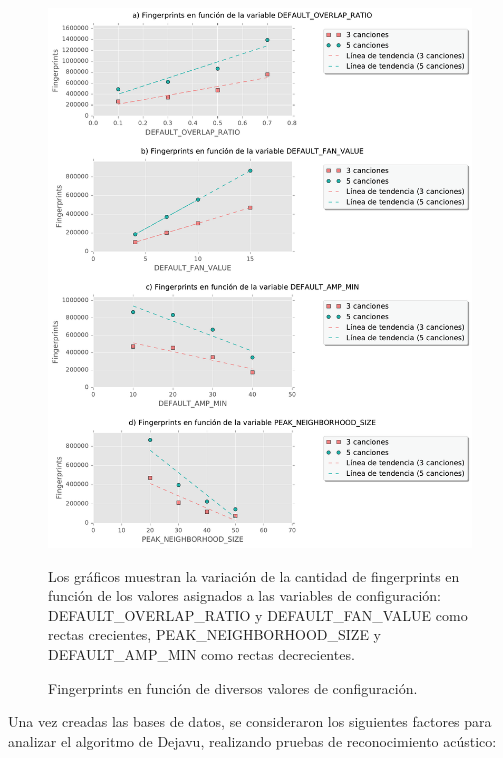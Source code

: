 \begin{figure}[h!]
    \centering
    \includegraphics[scale=0.6]{graficos/FingerprintsEnFuncionVariables.pdf}
    \caption{Fingerprints en función de diversos valores de configuración.}{Los gráficos muestran la variación de la cantidad de fingerprints en función de los valores asignados a las variables de configuración: DEFAULT\_OVERLAP\_RATIO y DEFAULT\_FAN\_VALUE como rectas crecientes, PEAK\_NEIGHBORHOOD\_SIZE y DEFAULT\_AMP\_MIN como rectas decrecientes.}      
    \label{fig:FingerprintsEnFuncionVariables}
\end{figure}

Una vez creadas las bases de datos, se consideraron los siguientes factores para analizar el algoritmo de Dejavu, realizando pruebas de reconocimiento acústico:

